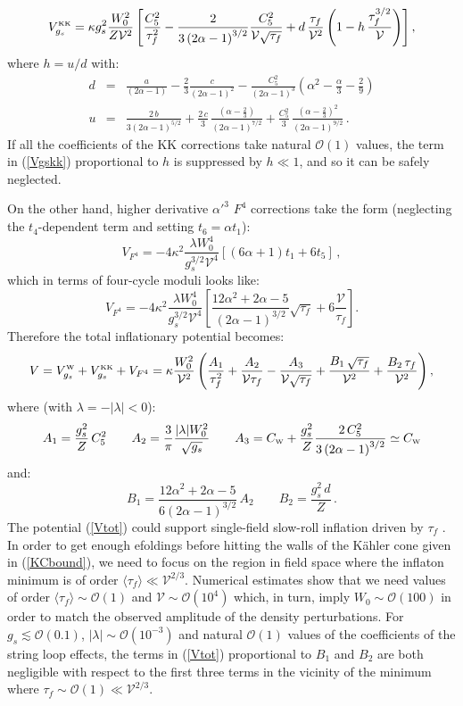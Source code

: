 \documentclass[11pt,a4paper]{article}
\newcommand{\bea}{\begin{eqnarray}}
\newcommand{\eea}{\end{eqnarray}}
\newcommand{\be}{\begin{equation}}
\newcommand{\ee}{\end{equation}}
\def\nn{\nonumber}
\def\KK{{\scriptscriptstyle \rm KK}}
\def\W{{\scriptscriptstyle \rm W}}
\newcommand\vo{{\mathcal{V}}}
\newcommand{\mc}{\mathcal}
\begin{document}
\be
V_{g_s}^\KK = \kappa g_s^2\frac{W_0^2}{Z\vo^2} \left[\frac{C_5^2}{\tau_f^2}  - \frac{2}{3\left(2\alpha-1\right)^{3/2}}\frac{C_5^2}{\vo\sqrt{\tau_f}}
+ d\,\frac{\tau_f}{\vo^2}\left(1 -h\, \frac{\tau_f^{3/2}}{\vo}\right)\right], 
\label{Vgskk}
\ee
where $h=u/d$ with:
\bea
d &=&  \frac{a}{\left(2\alpha-1\right)}
- \frac23 \frac{c}{\left(2\alpha-1\right)^2}
- \frac{C_5^2}{\left(2\alpha-1\right)^3}\left(\alpha^2-\frac{\alpha}{3}-\frac29\right) \nn \\
u &=& \frac{2\,b}{3\left(2\alpha-1\right)^{5/2}} 
 +  \frac{2\,c}{3}\,\frac{\left(\alpha-\frac23 \right)}{\left(2\alpha-1\right)^{7/2}} 
+\frac{C_5^2}{3}\,\frac{\left(\alpha-\frac23 \right)^2}{\left(2\alpha-1\right)^{9/2}}\,. \nn
\eea
If all the coefficients of the KK corrections take natural $\mc{O}(1)$ values, the term in (\ref{Vgskk}) proportional to $h$ is suppressed by $h\ll1$, 
and so it can be safely neglected. 

On the other hand, higher derivative $\alpha'^3$ $F^4$ corrections take the form (neglecting the $t_4$-dependent term and setting $t_6=\alpha t_1$):
\be
V_{F^4}=-4\kappa^2 \frac{\lambda W_0^4}{g_s^{3/2}\vo^4}\left[(6\alpha+1) t_1+6t_5 \right]\,,
\ee
which in terms of four-cycle moduli looks like:
\be
V_{F^4}=-4\kappa^2 \frac{\lambda W_0^4}{g_s^{3/2}\vo^4}\left[ \frac{12\alpha^2+2\alpha-5}{(2\alpha-1)^{3/2}}
\sqrt{\tau_f}+ 6\frac{\vo}{\tau_f} \right].
\ee
Therefore the total inflationary potential becomes:
\be
V = V_{g_s}^\W+V_{g_s}^\KK + V_{F^4}  
= \kappa \frac{W_0^2}{\vo^2}\left(\frac{A_1}{\tau_f^2}+\frac{A_2}{\vo\tau_f}-\frac{A_3}{\vo\sqrt{\tau_f}}+\frac{B_1\,\sqrt{\tau_f}}{\vo^2}+\frac{B_2\,\tau_f}{\vo^2}\right),
\label{Vtot}
\ee
where (with $\lambda=-|\lambda|<0$):
\be
A_1=\frac{g_s^2}{Z}\,C_5^2\qquad 
A_2 = \frac{3}{\pi} \frac{|\lambda| W_0^2}{\sqrt{g_s}}
\qquad A_3= C_\W+ \frac{g_s^2}{Z}\frac{2\,C_5^2}{3\left(2\alpha-1\right)^{3/2}}\simeq C_\W
\ee
and:
\be
B_1 = \frac{12\alpha^2+2\alpha-5}{6(2\alpha-1)^{3/2}}\,A_2 \qquad B_2= \frac{g_s^2\,d}{Z} \,.
\ee
The potential (\ref{Vtot}) could support single-field slow-roll inflation driven by $\tau_f$ \cite{Cicoli:2008gp, Cicoli:2016chb}. In order to get enough efoldings before hitting the walls of the K\"ahler cone given in (\ref{KCbound}), we need to focus on the region in field space where the inflaton minimum is of order $\langle\tau_f\rangle\ll \vo^{2/3}$. Numerical estimates show that we need values of order $\langle\tau_f\rangle \sim\mc{O}(1)$ and $\vo \sim\mc{O}(10^4)$ which, in turn, imply $W_0\sim\mc{O}(100)$ in order to match the observed amplitude of the density perturbations. For $g_s\lesssim\mc{O}(0.1)$, $|\lambda|\sim\mc{O}(10^{-3})$ and natural $\mc{O}(1)$ values of the coefficients of the string loop effects, the terms in (\ref{Vtot}) proportional to $B_1$ and $B_2$ are both negligible with respect to the first three terms in the vicinity of the minimum where $\tau_f\sim \mc{O}(1)\ll\vo^{2/3}$. 
\end{document}
